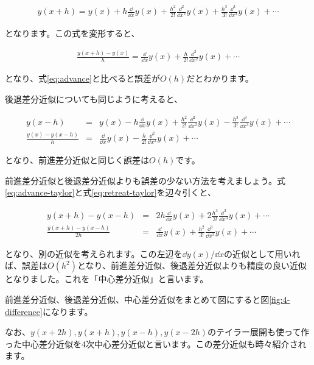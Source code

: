 \begin{eqnarray}
    \label{eq:advance-taylor}
    y(x+h)=y(x)+h\frac{\dd}{\dd x}y(x)+\frac{h^2}{2!}\frac{\dd^2}{\dd x^2}y(x)+\frac{h^3}{3!}\frac{\dd^3}{\dd x^3}y(x)+\cdots
\end{eqnarray}

\noindent
となります。この式を変形すると、

\begin{eqnarray}
    \frac{y(x+h)-y(x)}{h}=\frac{\dd}{\dd x}y(x)+\frac{h}{2!}\frac{\dd^2}{\dd x^2}y(x)+\cdots
\end{eqnarray}

\noindent
となり、式\ref{eq:advance}と比べると誤差が$O(h)$だとわかります。

後退差分近似についても同じように考えると、

\begin{eqnarray}
    \label{eq:retreat-taylor}
    y(x-h)&=&y(x)-h\frac{\dd}{\dd x}y(x)+\frac{h^2}{2!}\frac{\dd^2}{\dd x^2}y(x)-\frac{h^3}{3!}\frac{\dd^3}{\dd x^3}y(x)+\cdots \\
    \frac{y(x)-y(x-h)}{h}&=&\frac{\dd}{\dd x}y(x)-\frac{h}{2!}\frac{\dd^2}{\dd x^2}y(x)+\cdots
\end{eqnarray}

\noindent
となり、前進差分近似と同じく誤差は$O(h)$です。

前進差分近似と後退差分近似よりも誤差の少ない方法を考えましょう。式\ref{eq:advance-taylor}と式\ref{eq:retreat-taylor}を辺々引くと、

\begin{eqnarray}
    y(x+h)-y(x-h)&=&2h\frac{\dd}{\dd x}y(x)+2\frac{h^3}{3!}\frac{\dd^3}{\dd x^3}y(x)+\cdots \\
    \frac{y(x+h)-y(x-h)}{2h}&=&\frac{\dd}{\dd x}y(x)+\frac{h^2}{3!}\frac{\dd^3}{\dd x^3}y(x)+\cdots
\end{eqnarray}

\noindent
となり、別の近似を考えられます。この左辺を$\dd y(x)/\dd x$の近似として用いれば、誤差は$O(h^2)$となり、前進差分近似、後退差分近似よりも精度の良い近似となりました。これを「中心差分近似」と言います。

前進差分近似、後退差分近似、中心差分近似をまとめて図にすると図\ref{fig:4-difference}になります。

なお、$y(x+2h),y(x+h),y(x-h),y(x-2h)$のテイラー展開も使って作った中心差分近似を4次中心差分近似と言います。この差分近似も時々紹介されます。

